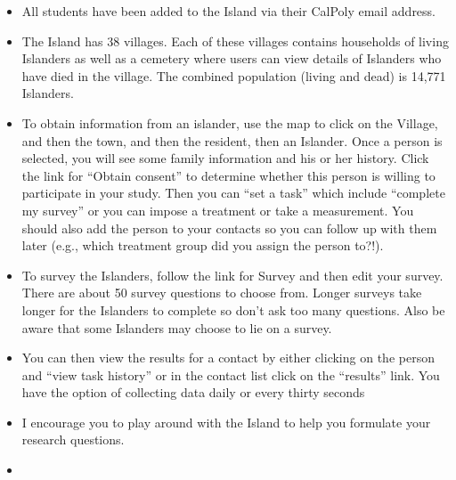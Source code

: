\documentclass[letterpaper,12pt]{report}
\begin{document}
{}
\begin{itemize}
    \item All students have been added to the Island via their CalPoly email address.
    \item The Island has 38 villages. Each of these villages contains households of living Islanders as well as a cemetery where users can view details of Islanders who have died in the village. The combined population (living and dead) is 14,771 Islanders.
    \item To obtain information from an islander, use the map to click on the Village, and then the town, and then the resident, then an Islander. Once a person is selected, you will see some family information and his or her history.  Click the link for ``Obtain consent'' to determine whether this person is willing to participate in your study.  Then you can ``set a task'' which include ``complete my survey'' or you can impose a treatment or take a measurement. You should also add the person to your contacts so you can follow up with them later (e.g., which treatment group did you assign the person to?!).
    \item To survey the Islanders, follow the link for Survey and then edit your survey. There are about 50 survey questions to choose from. Longer surveys take longer for the Islanders to complete so don’t ask too many questions.  Also be aware that some Islanders may choose to lie on a survey.
    \item You can then view the results for a contact by either clicking on the person and “view task history” or in the contact list click on the “results” link.   You have the option of collecting data daily or every thirty seconds
    \item I encourage you to play around with the Island to help you formulate your research questions.
    \item[]
\end{itemize}
\end{document}
